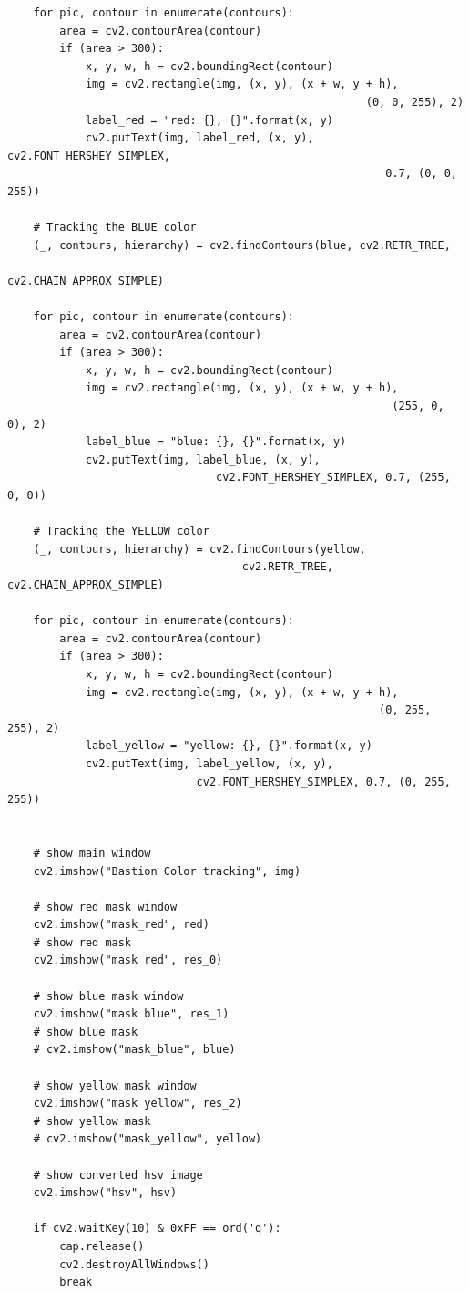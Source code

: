 \documentclass[12pt,a4paper]{article}
\begin{document}
\begin{verbatim}
    for pic, contour in enumerate(contours):
        area = cv2.contourArea(contour)
        if (area > 300):
            x, y, w, h = cv2.boundingRect(contour)
            img = cv2.rectangle(img, (x, y), (x + w, y + h), 
                                                       (0, 0, 255), 2)
            label_red = "red: {}, {}".format(x, y)
            cv2.putText(img, label_red, (x, y), cv2.FONT_HERSHEY_SIMPLEX, 
                                                          0.7, (0, 0, 255))

    # Tracking the BLUE color
    (_, contours, hierarchy) = cv2.findContours(blue, cv2.RETR_TREE, 
                                                    cv2.CHAIN_APPROX_SIMPLE)

    for pic, contour in enumerate(contours):
        area = cv2.contourArea(contour)
        if (area > 300):
            x, y, w, h = cv2.boundingRect(contour)
            img = cv2.rectangle(img, (x, y), (x + w, y + h), 
                                                           (255, 0, 0), 2)
            label_blue = "blue: {}, {}".format(x, y)
            cv2.putText(img, label_blue, (x, y), 
                                cv2.FONT_HERSHEY_SIMPLEX, 0.7, (255, 0, 0))

    # Tracking the YELLOW color
    (_, contours, hierarchy) = cv2.findContours(yellow, 
                                    cv2.RETR_TREE, cv2.CHAIN_APPROX_SIMPLE)

    for pic, contour in enumerate(contours):
        area = cv2.contourArea(contour)
        if (area > 300):
            x, y, w, h = cv2.boundingRect(contour)
            img = cv2.rectangle(img, (x, y), (x + w, y + h),
                                                         (0, 255, 255), 2)
            label_yellow = "yellow: {}, {}".format(x, y)
            cv2.putText(img, label_yellow, (x, y), 
                             cv2.FONT_HERSHEY_SIMPLEX, 0.7, (0, 255, 255))


    # show main window
    cv2.imshow("Bastion Color tracking", img)

    # show red mask window
    cv2.imshow("mask_red", red)
    # show red mask
    cv2.imshow("mask red", res_0)

    # show blue mask window
    cv2.imshow("mask blue", res_1)
    # show blue mask
    # cv2.imshow("mask_blue", blue)

    # show yellow mask window
    cv2.imshow("mask yellow", res_2)
    # show yellow mask
    # cv2.imshow("mask_yellow", yellow)

    # show converted hsv image
    cv2.imshow("hsv", hsv)

    if cv2.waitKey(10) & 0xFF == ord('q'):
        cap.release()
        cv2.destroyAllWindows()
        break
\end{verbatim}
\end{document}
